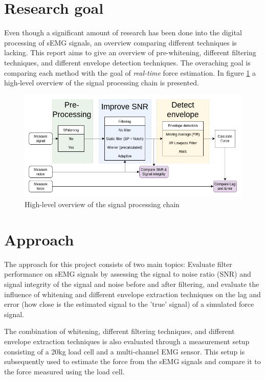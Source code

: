 \section{Research goal}
Even though a significant amount of research has been done into the digital processing of sEMG signals, an overview comparing different techniques is lacking. This report aims to give an overview of pre-whitening, different filtering techniques, and different envelope detection techniques. The overaching goal is comparing each method with the goal of \textit{real-time} force estimation. 
In figure \ref{fig:global_thesis_flowchart} a high-level overview of the signal processing chain is presented. 

\begin{figure}[h!t]
	\begin{center}
		\includegraphics[width=1.0\columnwidth]{images/global_thesis_flowchart.png}
	\end{center}
	\caption{High-level overview of the signal processing chain}
	\label{fig:global_thesis_flowchart}
\end{figure}


\section{Approach}
The approach for this project consists of two main topics: Evaluate filter performance on sEMG signals by assessing the signal to noise ratio (SNR) and signal integrity of the signal and noise before and after filtering, and evaluate the influence of whitening and different envelope extraction techniques on the lag and error (how close is the estimated signal to the 'true' signal) of a simulated force signal.

The combination of whitening, different filtering techniques, and different envelope extraction techniques is also evaluated through a measurement setup consisting of a 20kg load cell and a multi-channel EMG sensor. This setup is subsequently used to estimate the force from the sEMG signals and compare it to the force measured using the load cell.